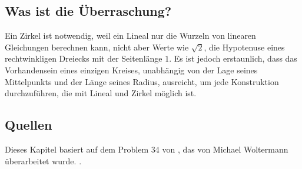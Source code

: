 \subsection*{Was ist die Überraschung?}

Ein Zirkel ist notwendig, weil ein Lineal nur die Wurzeln von linearen Gleichungen berechnen kann, nicht aber Werte wie $\sqrt{2}$, die Hypotenuse eines rechtwinkligen Dreiecks mit der Seitenlänge $1$. Es ist jedoch erstaunlich, dass das Vorhandensein eines einzigen Kreises, unabhängig von der Lage seines Mittelpunkts und der Länge seines Radius, ausreicht, um jede Konstruktion durchzuführen, die mit Lineal und Zirkel möglich ist.

\subsection*{Quellen}

Dieses Kapitel basiert auf dem Problem $34$ von \cite{dorrie1}, das von Michael Woltermann überarbeitet wurde. \cite{dorrie2}.

